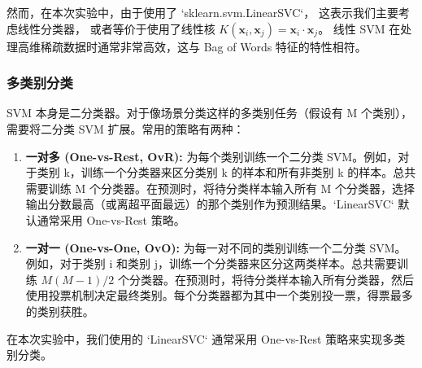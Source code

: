 然而，在本次实验中，由于使用了 `sklearn.svm.LinearSVC`，
这表示我们主要考虑线性分类器，
或者等价于使用了线性核 
    \(K(\mathbf{x}_i, \mathbf{x}_j) = \mathbf{x}_i \cdot \mathbf{x}_j\)。
线性 SVM 在处理高维稀疏数据时通常非常高效，这与 Bag of Words 特征的特性相符。

\subsubsection{多类别分类}

SVM 本身是二分类器。对于像场景分类这样的多类别任务（假设有 M 个类别），
需要将二分类 SVM 扩展。常用的策略有两种：

\begin{enumerate}
    \item \textbf{一对多 (One-vs-Rest, OvR):} 为每个类别训练一个二分类 SVM。例如，对于类别 k，训练一个分类器来区分类别 k 的样本和所有非类别 k 的样本。总共需要训练 M 个分类器。在预测时，将待分类样本输入所有 M 个分类器，选择输出分数最高（或离超平面最远）的那个类别作为预测结果。`LinearSVC` 默认通常采用 One-vs-Rest 策略。
    \item \textbf{一对一 (One-vs-One, OvO):} 为每一对不同的类别训练一个二分类 SVM。例如，对于类别 i 和类别 j，训练一个分类器来区分这两类样本。总共需要训练 \(M(M-1)/2\) 个分类器。在预测时，将待分类样本输入所有分类器，然后使用投票机制决定最终类别。每个分类器都为其中一个类别投一票，得票最多的类别获胜。
\end{enumerate}
在本次实验中，我们使用的 `LinearSVC` 通常采用 One-vs-Rest 策略来实现多类别分类。
